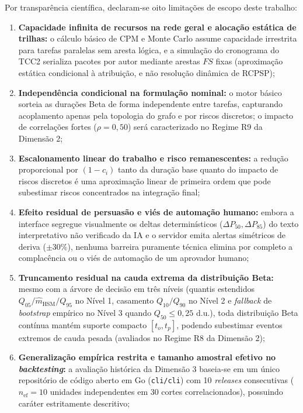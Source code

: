 \documentclass[12pt,openany,oneside,a4paper,english,brazilian,sumario=tradicional]{abntex2}
\begin{document}
Por transparência científica, declaram-se oito limitações de escopo deste trabalho:
\begin{enumerate}
  \item \textbf{Capacidade infinita de recursos na rede geral e alocação estática de trilhas:} o cálculo básico de CPM e Monte Carlo assume capacidade irrestrita para tarefas paralelas sem aresta lógica, e a simulação do cronograma do TCC2 serializa pacotes por autor mediante arestas $FS$ fixas (aproximação estática condicional à atribuição, e não resolução dinâmica de RCPSP);
  \item \textbf{Independência condicional na formulação nominal:} o motor básico sorteia as durações Beta de forma independente entre tarefas, capturando acoplamento apenas pela topologia do grafo e por riscos discretos; o impacto de correlações fortes ($\rho=0{,}50$) será caracterizado no Regime R9 da Dimensão 2;
  \item \textbf{Escalonamento linear do trabalho e risco remanescentes:} a redução proporcional por $(1-c_i)$ tanto da duração base quanto do impacto de riscos discretos é uma aproximação linear de primeira ordem que pode subestimar riscos concentrados na integração final;
  \item \textbf{Efeito residual de persuasão e viés de automação humano:} embora a interface segregue visualmente os deltas determinísticos ($\Delta P_{50}, \Delta P_{85}$) do texto interpretativo não verificado da IA e o servidor emita alertas simétricos de deriva ($\pm 30\%$), nenhuma barreira puramente técnica elimina por completo a complacência ou o viés de automação de um aprovador humano;
  \item \textbf{Truncamento residual na cauda extrema da distribuição Beta:} mesmo com a árvore de decisão em três níveis (quantis estendidos $Q_{05}/\hat{m}_{\mathrm{HSM}}/Q_{95}$ no Nível 1, casamento $Q_{10}/Q_{90}$ no Nível 2 e \textit{fallback} de \textit{bootstrap} empírico no Nível 3 quando $Q_{50} \le 0{,}25$ d.u.), toda distribuição Beta contínua mantém suporte compacto $[t_o, t_p]$, podendo subestimar eventos extremos de cauda pesada (avaliados no Regime R8 da Dimensão 2);
  \item \textbf{Generalização empírica restrita e tamanho amostral efetivo no \textit{backtesting}:} a avaliação histórica da Dimensão 3 baseia-se em um único repositório de código aberto em Go (\texttt{cli/cli}) com 10 \textit{releases} consecutivas ($n_{\mathrm{ef}}=10$ unidades independentes em 30 cortes correlacionados), possuindo caráter estritamente descritivo;

\end{enumerate}
\end{document}
